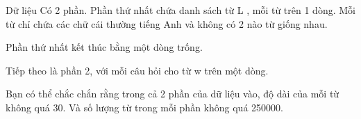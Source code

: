 Dữ liệu
Có 2 phần. Phần thứ nhất chứa danh sách từ       L      , mỗi từ trên 1 dòng. Mỗi từ chỉ chứa các chữ cái thường tiếng Anh và không có 2 nào từ giống nhau.  

   Phần thứ nhất kết thúc bằng một dòng trống.  

   Tiếp theo là phần 2, với mỗi câu hỏi cho từ       w      trên một dòng.  

   Bạn có thể chắc chắn rằng trong cả 2 phần của dữ liệu vào, độ dài của mỗi từ không quá 30. Và số lượng từ trong mỗi phần không quá 250000.
